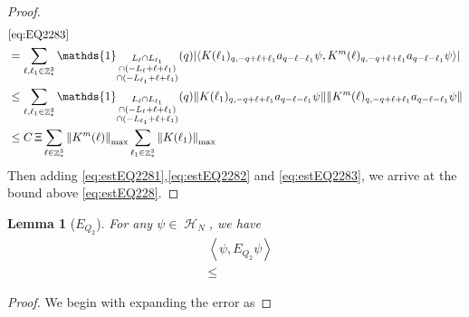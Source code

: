 \documentclass[sn-mathphys, Numbered ,a4paper]{sn-jnl}%
\DeclareMathOperator{\Z}{\mathbb{Z}}
\DeclareMathOperator{\HH}{\mathcal{H}}
\newcommand{\eva}[1]{\left\langle #1 \right\rangle}
\theoremstyle{plain}
\newtheorem{lemma}[theorem]{Lemma}
\theoremstyle{definition}
\theoremstyle{remark}
\theoremstyle{plain}
\theoremstyle{definition}
\theoremstyle{remark}
\begin{document}
\begin{proof}
\begin{align}
	& \eqref{eq:EQ2283}\nonumber\\
	&= \sum\limits_{\ell, \ell_1\in \Z^3_*} \mathds{1}_{\substack{L_{\ell}\cap L_{\ell_1}\\\cap (-L_{\ell}+\ell+\ell_1) \\ \cap (-L_{\ell_1}+\ell+\ell_1)}} (q) \abs{\eva{K(\ell_1)_{q,-q+\ell+\ell_1} a_{q-\ell-\ell_1} \psi, K^m(\ell)_{q,-q+\ell+\ell_1} a_{q-\ell-\ell_1}\psi }}\nonumber\\
	&\leq \sum\limits_{\ell, \ell_1\in \Z^3_*} \mathds{1}_{\substack{L_{\ell}\cap L_{\ell_1}\\\cap (-L_{\ell}+\ell+\ell_1) \\ \cap (-L_{\ell_1}+\ell+\ell_1)}} (q) \norm{K(\ell_1)_{q,-q+\ell+\ell_1} a_{q-\ell-\ell_1} \psi}\norm{ K^m(\ell)_{q,-q+\ell+\ell_1} a_{q-\ell-\ell_1}\psi }\nonumber\\
	&\leq C\,\Xi \sum\limits_{\ell \in \Z^3_*} \norm{K^m(\ell)}_{\mathrm{max}} \sum\limits_{\ell_1 \in \Z^3_*} \norm{K(\ell_1)}_{\mathrm{max}} \label{eq:estEQ2283}
\end{align} 
Then adding \eqref{eq:estEQ2281},\eqref{eq:estEQ2282} and \eqref{eq:estEQ2283}, we arrive at the bound above \eqref{eq:estEQ228}.  
\end{proof}

\begin{lemma}[$E_{Q_2}$]
    For any $\psi \in \HH_N$, we have
    \begin{align}
     &\eva{\psi,E_{Q_2}\psi }\nonumber\\ 
     &\leq 
    \end{align}
\end{lemma}
\begin{proof}
    We begin with expanding the error as
    
\end{proof}
\end{document}
